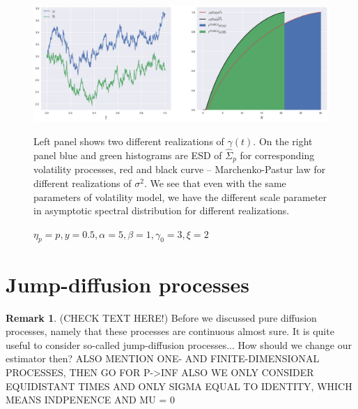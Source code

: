 \documentclass[a4paper,11pt]{article}
\theoremstyle{plain}
\theoremstyle{definition}
\newtheorem{rmrk}[thm]{Remark}
\begin{document}
    \begin{figure}
    	\begin{center} \centering
    		\includegraphics[scale=0.4]{XCIR}
    		\caption{$\eta_p = p, y = 0.5, \alpha = 5, \beta = 1, \gamma_0 = 3, \xi = 2$}
    		\smallskip
    		\small
    		Left panel shows two different realizations of $\gamma(t)$. On the right panel blue and green histograms are ESD of $\widehat{\Sigma}_p$ for corresponding volatility processes, red and black curve -- Marchenko-Pastur law for different realizations of $\sigma^2$. We see that even with the same parameters of volatility model, we have the different scale parameter in asymptotic spectral distribution for different realizations.
    	\end{center}
    \end{figure}
    
    \pagebreak
    \part{Jump-diffusion processes}
    \begin{rmrk}
    	(CHECK TEXT HERE!)
    	Before we discussed pure diffusion processes, namely that these processes are continuous almost sure. It is quite useful to consider so-called jump-diffusion processes... How should we change our estimator then?
    	ALSO MENTION ONE- AND FINITE-DIMENSIONAL PROCESSES, THEN GO FOR P->INF
    	ALSO WE ONLY CONSIDER EQUIDISTANT TIMES
    	AND ONLY SIGMA EQUAL TO IDENTITY, WHICH MEANS INDPENENCE
    	AND MU = 0
    \end{rmrk}
    
\end{document}
